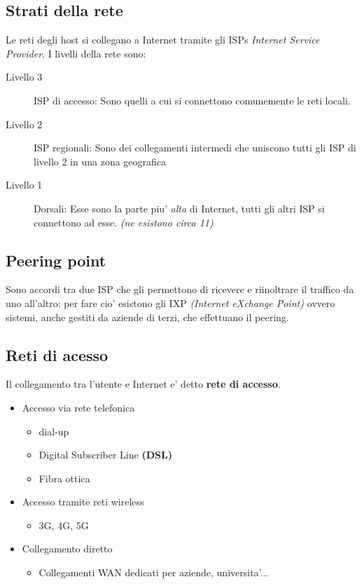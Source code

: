 \subsection{Strati della rete}
Le reti degli host si collegano a Internet tramite gli ISPs \textit{Internet Service Provider}.
I livelli della rete sono:
\begin{description}
    \item[Livello 3] ISP di accesso: Sono quelli a cui si connettono comunemente le reti locali.
    \item[Livello 2] ISP regionali: Sono dei collegamenti intermedi che uniscono tutti gli ISP di livello 2 in una zona geografica
    \item[Livello 1] Dorsali: Esse sono la parte piu' \textit{alta} di Internet, tutti gli altri ISP si connettono ad esse. \textit{(ne esistono circa 11)}
\end{description}

\subsection{Peering point}
Sono accordi tra due ISP che gli permettono di ricevere e riinoltrare il traffico da uno all'altro:
per fare cio' esistono gli IXP \textit{(Internet eXchange Point)} ovvero sistemi, anche gestiti da aziende di terzi, che effettuano il peering.
\subsection{Reti di acesso}
Il collegamento tra l'utente e Internet e' detto \textbf{rete di accesso}.
\begin{itemize}
    \item Accesso via rete telefonica
    \begin{itemize}
        \item dial-up
        \item Digital Subscriber Line \textbf{(DSL)}
        \item Fibra ottica
    \end{itemize}
    \item Accesso tramite reti wireless
    \begin{itemize}
        \item 3G, 4G, 5G
    \end{itemize}
    \item Collegamento diretto
    \begin{itemize}
        \item Collegamenti WAN dedicati per aziende, universita'...
    \end{itemize}
\end{itemize}
\newpage
